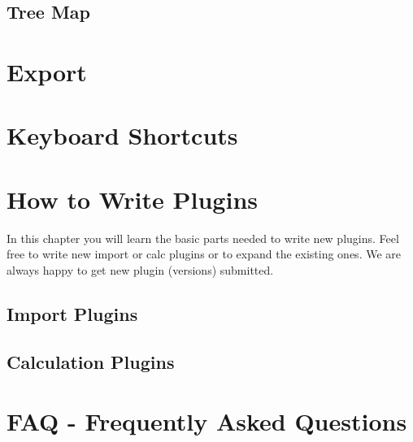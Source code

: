 \documentclass[a4paper,10pt,english,twoside,bibliography=totoc,listof=totoc]{scrbook}
\begin{document}
  \section{Tree Map}
    

\chapter{Export}
	




\begin{appendix}

\chapter{Keyboard Shortcuts} \label{chap:scaffoldhunter:shortcuts}
  

\chapter{How to Write Plugins} \label{chap:scaffoldhunter:writeplugins}
In this chapter you will learn the basic parts needed to write new plugins.
Feel free to write new import or calc plugins or to expand the existing ones.
We are always happy to get new plugin (versions) submitted.

    \section{Import Plugins}
      
    
    \section{Calculation Plugins}
      

\chapter{FAQ - Frequently Asked Questions}
    

\end{appendix}
\end{document}

